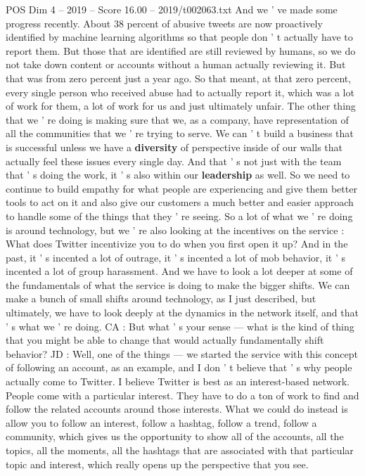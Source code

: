 \begin{textsample}{POS Dim 4 – 2019 – Score 16.00 – 2019/t002063.txt}
And we ' ve made some progress recently.
About 38 percent of abusive tweets are now proactively identified by machine learning algorithms so that people don ' t actually have to report them.
But those that are identified are still reviewed by humans, so we do not take down content or accounts without a human actually reviewing it.
But that was from zero percent just a year ago.
So that meant, at that zero percent, every single person who received abuse had to actually report it, which was a lot of work for them, a lot of work for us and just ultimately unfair.
The other thing that we ' re doing is making sure that we, as a company, have representation of all the communities that we ' re trying to serve.
We can ' t build a business that is successful unless we have a \textbf{diversity} of perspective inside of our walls that actually feel these issues every single day.
And that ' s not just with the team that ' s doing the work, it ' s also within our \textbf{leadership} as well.
So we need to continue to build empathy for what people are experiencing and give them better tools to act on it and also give our customers a much better and easier approach to handle some of the things that they ' re seeing.
So a lot of what we ' re doing is around technology, but we ' re also looking at the incentives on the service : What does Twitter incentivize you to do when you first open it up?
And in the past, it ' s incented a lot of outrage, it ' s incented a lot of mob behavior, it ' s incented a lot of group harassment.
And we have to look a lot deeper at some of the fundamentals of what the service is doing to make the bigger shifts.
We can make a bunch of small shifts around technology, as I just described, but ultimately, we have to look deeply at the dynamics in the network itself, and that ' s what we ' re doing.
CA : But what ' s your sense — what is the kind of thing that you might be able to change that would actually fundamentally shift behavior?
JD : Well, one of the things — we started the service with this concept of following an account, as an example, and I don ' t believe that ' s why people actually come to Twitter.
I believe Twitter is best as an interest-based network.
People come with a particular interest.
They have to do a ton of work to find and follow the related accounts around those interests.
What we could do instead is allow you to follow an interest, follow a hashtag, follow a trend, follow a community, which gives us the opportunity to show all of the accounts, all the topics, all the moments, all the hashtags that are associated with that particular topic and interest, which really opens up the perspective that you see.

\end{textsample}
